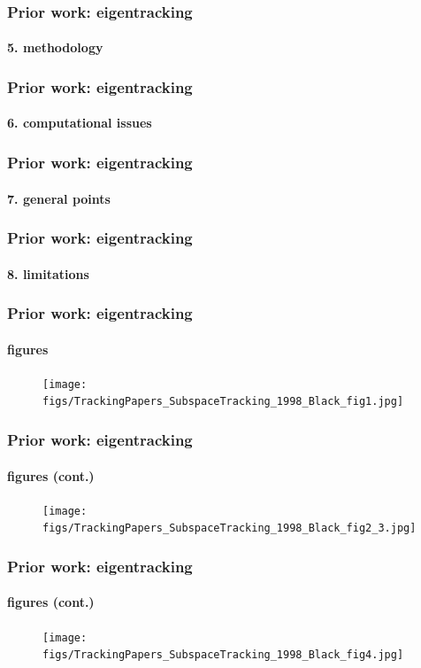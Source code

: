 \begin{frame}
\frametitle{Prior work: eigentracking}
\framesubtitle{5. methodology}
\logoCSIPCPL\mypagenum
{}
\end{frame}


\begin{frame}
\frametitle{Prior work: eigentracking}
\framesubtitle{6. computational issues}
\logoCSIPCPL\mypagenum
{}
\end{frame}


\begin{frame}
\frametitle{Prior work: eigentracking}
\framesubtitle{7. general points}
\logoCSIPCPL\mypagenum
{}
\end{frame}



\begin{frame}
\frametitle{Prior work: eigentracking}
\framesubtitle{8. limitations}
\logoCSIPCPL\mypagenum
{}
\end{frame}



\begin{frame}
\frametitle{Prior work: eigentracking}
\framesubtitle{figures}
\logoCSIPCPL\mypagenum
	\begin{figure}
		\texttt{[image: figs/TrackingPapers\_SubspaceTracking\_1998\_Black\_fig1.jpg]}
	\end{figure}
\end{frame}



\begin{frame}
\frametitle{Prior work: eigentracking}
\framesubtitle{figures (cont.)}
\logoCSIPCPL\mypagenum
	\begin{figure}
		\texttt{[image: figs/TrackingPapers\_SubspaceTracking\_1998\_Black\_fig2\_3.jpg]}
	\end{figure}
\end{frame}



\begin{frame}
\frametitle{Prior work: eigentracking}
\framesubtitle{figures (cont.)}
\logoCSIPCPL\mypagenum
	\begin{figure}
		\texttt{[image: figs/TrackingPapers\_SubspaceTracking\_1998\_Black\_fig4.jpg]}
	\end{figure}
\end{frame}



